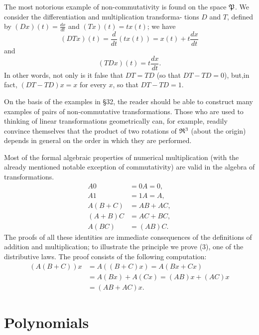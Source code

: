 The most notorious example of non-commutativity is found on the space
\(\mathfrak{P}\). We consider the differentiation and multiplication transforma-
tions \(D\) and \(T\), defined by \(\displaystyle(Dx)(t) = \frac{dx}{dt}\) and
\((Tx)(t) = tx(t)\); we have
\begin{equation*}
    (DTx)(t) = \frac{d}{dt}(tx(t)) = x(t) + t\frac{dx}{dt}
\end{equation*}
and
\begin{equation*}
    (TDx)(t) = t \frac{dx}{dt}.
\end{equation*}
In other words, not only is it false that \(DT = TD\) (so that \(DT - TD = 0\)),
but,in fact, \((DT- TD)x = x\) for every \(x\), so that \(DT - TD = 1\).

On the basis of the examples in §32, the reader should be able to construct many
examples of pairs of non-commutative transformations. Those who are used to
thinking of linear transformations geometrically can, for example, readily
convince themselves that the product of two rotations of \(\mathfrak{R}^3\) (about the
origin) depends in general on the order in which they are performed.

Most of the formal algebraic properties of numerical multiplication (with the
already mentioned notable exception of commutativity) are valid in the algebra
of transformations.
\begin{align}
    A0 &= 0A = 0,\\
    A1 &= 1A = A,\\
    A (B + C) &= AB + AC,\\
    (A + B)C &= AC + BC,\\
    A(BC) &= (AB)C.
\end{align}
The proofs of all these identities are immediate consequences of the definitions
of addition and multiplication; to illustrate the principle we prove (3), one of
the distributive laws. The proof consists of the following computation:
\begin{align*}
    (A (B + C))x &= A((B + C)x) = A(Bx + Cx)\\
    &= A(Bx) + A(Cx) = (AB)x + (AC)x\\
    &= (AB + AC)x.
\end{align*}

\section{Polynomials}

